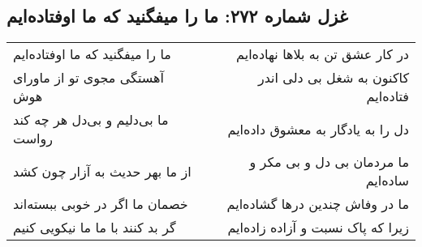 \begin{center}
\section*{غزل شماره ۲۷۲: ما را میفگنید که ما اوفتاده‌ایم}
\label{sec:272}
\begin{longtable}{l p{0.5cm} r}
ما را میفگنید که ما اوفتاده‌ایم
&&
در کار عشق تن به بلاها نهاده‌ایم
\\
آهستگی مجوی تو از ماورای هوش
&&
کاکنون به شغل بی دلی اندر فتاده‌ایم
\\
ما بی‌دلیم و بی‌دل هر چه کند رواست
&&
دل را به یادگار به معشوق داده‌ایم
\\
از ما بهر حدیث به آزار چون کشد
&&
ما مردمان بی دل و بی مکر و ساده‌ایم
\\
خصمان ما اگر در خوبی ببسته‌اند
&&
ما در وفاش چندین درها گشاده‌ایم
\\
گر بد کنند با ما ما نیکویی کنیم
&&
زیرا که پاک نسبت و آزاده زاده‌ایم
\\
\end{longtable}
\end{center}
